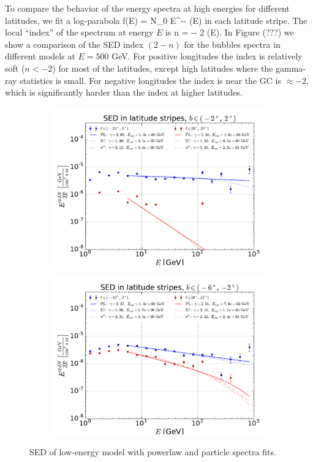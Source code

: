 To compare the behavior of the energy spectra at high energies for different latitudes, 
we fit a log-parabola
 \be
 f(E) = N_0 E^{-\alpha - \beta \ln(E)}
 \ee
in each latitude stripe. The local ``index'' of the spectrum at energy $E$ is
 \be 
n \equiv {} = -\alpha - 2 \beta \ln(E).
 \ee
In Figure (???) we show a comparison of the SED index $(2 - n)$
for the bubbles spectra in different models at $E = 500$ GeV.
For positive longitudes the index is relatively soft ($n < -2$) for most of the latitudes, 
except high latitudes where the gamma-ray statistics is small.
For negative longitudes the index is near the GC is $\approx -2$, 
which is significantly harder than the index at higher latitudes.

\begin{figure}[h!]
    \begin{subfigure}{0.5\textwidth}
        \includegraphics[width=\textwidth]{plots/SED_lowE_source_0cutoff.pdf}
    \end{subfigure} 
    \begin{subfigure}{0.5\textwidth}
        \includegraphics[width=\textwidth]{plots/SED_lowE_source_-4cutoff.pdf}
    \end{subfigure}
  	\caption{SED of low-energy model with powerlaw and particle spectra fits.}
  	\label{fig:SED_with_fits}
\end{figure}





